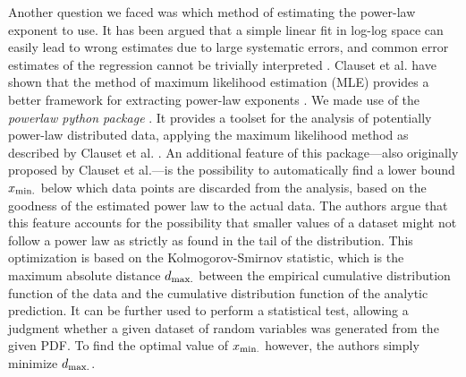 \documentclass[10pt,letterpaper]{article}
\begin{document}
Another question we faced was which method of estimating the power-law exponent to use. It has been argued that a simple linear fit in log-log space can easily lead to wrong estimates due to large systematic errors, and common error estimates of the regression cannot be trivially interpreted \cite{Bauke_2007,Clauset_2009}. Clauset et al. have shown that the method of maximum likelihood estimation (MLE) provides a better framework for extracting power-law exponents \cite{Clauset_2009}. We made use of the \textit{powerlaw python package} \cite{Powerlaw_Package,Alstott_2014}. It provides a toolset for the analysis of potentially power-law distributed data, applying the maximum likelihood method as described by Clauset et al. \cite{Clauset_2009}. An additional feature of this package---also originally proposed by Clauset et al.---is the possibility to automatically find a lower bound $x_{\rm min.}$ below which data points are discarded from the analysis, based on the goodness of the estimated power law to the actual data. The authors argue that this feature accounts for the possibility that smaller values of a dataset might not follow a power law as strictly as found in the tail of the distribution. This optimization is based on the Kolmogorov-Smirnov statistic, which is the maximum absolute distance $d_{\rm max.}$ between the empirical cumulative distribution function of the data and the cumulative distribution function of the analytic prediction. It can be further used to perform a statistical test, allowing a judgment whether a given dataset of random variables was generated from the given PDF. To find the optimal value of $x_{\rm min.}$ however, the authors simply minimize $d_{\rm max.}$. 
\end{document}

